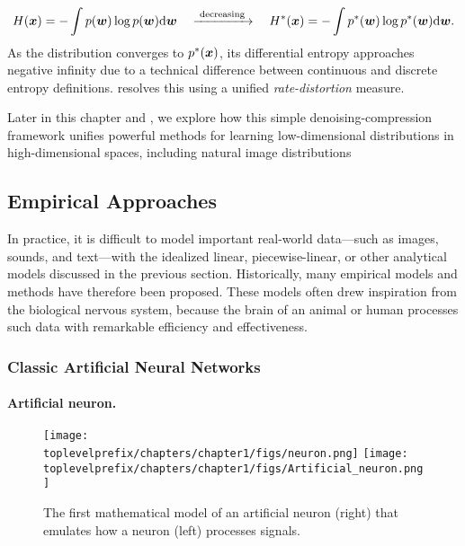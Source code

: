 \documentclass[../../book-main.tex]{subfiles}
\begin{document}
\begin{equation}
H(\bm{x}) = - \int p(\boldsymbol{w}) \log p(\boldsymbol{w}) \mathrm{d}\boldsymbol{w} \quad \xrightarrow{\hspace{1mm} \text{decreasing} \hspace{1mm}} \quad H^*(\bm{x}) = - \int p^*(\boldsymbol{w}) \log p^*(\boldsymbol{w}) \mathrm{d}\boldsymbol{w}.
\end{equation}
As the distribution converges to $p^*(\bm{x})$, its differential entropy approaches negative infinity due to a technical difference between continuous and discrete entropy definitions.  resolves this using a unified \textit{rate-distortion} measure.

Later in this chapter and , we explore how this simple denoising-compression framework unifies powerful methods for learning low-dimensional distributions in high-dimensional spaces, including natural image distributions
\subsection{Empirical Approaches}
In practice, it is difficult to model important real-world data---such as images, sounds, and text---with the idealized linear, piecewise-linear, or other analytical models discussed in the previous section. Historically, many empirical models and methods have therefore been proposed. These models often drew inspiration from the biological nervous system, because the brain of an animal or human processes such data with remarkable efficiency and effectiveness.

\subsubsection{Classic Artificial Neural Networks}
\paragraph{Artificial neuron.}

\begin{figure}[t]
    \centering
    \texttt{[image: \\toplevelprefix/chapters/chapter1/figs/neuron.png]} \hspace{3mm}   
    \texttt{[image: \\toplevelprefix/chapters/chapter1/figs/Artificial\_neuron.png]}
    \caption{The first mathematical model of an artificial neuron (right) that emulates how a neuron (left) processes signals.}
    \label{fig:neuron}
\end{figure}
\end{document}
